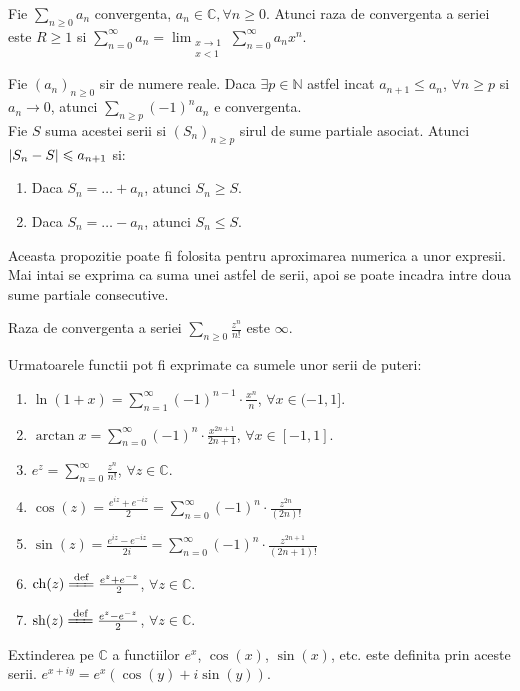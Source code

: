 \documentclass{article}
\begin{document}
\begin{enumerate}
  \propozitie Fie $\sum_{n \geq 0} a_n$ convergenta, $a_n \in \mathbb{C}, \forall n \geq 0$. Atunci raza de convergenta a seriei este $R \geq 1$ si $\sum_{n = 0}^{\infty} a_n = \lim_{\substack{ x \to 1 \\ x < 1}} \sum_{n = 0}^{\infty} a_n x^n$.

\begin{tcolorbox}
  \propozitie Fie $(a_n)_{n \geq 0}$ sir de numere reale. Daca $\exists p \in \mathbb{N}$ astfel incat $a_{n+1} \leq a_n$, $\forall n \geq p$ si $a_n \to 0$, atunci $\sum_{n \geq p} (-1)^n a_n$ e convergenta. \\ Fie $S$ suma acestei serii si $(S_n)_{n \geq p}$ sirul de sume partiale asociat. Atunci $\left\lvert S_n - S \right\rvert \leqslant a_{n+1}$ si:
  \begin{enumerate}
  \item Daca $S_n = \dots + a_n$, atunci $S_n \geq S$.
  \item Daca $S_n = \dots - a_n$, atunci $S_n \leq S$.
  \end{enumerate}

  \observatie Aceasta propozitie poate fi folosita pentru aproximarea numerica a unor expresii. Mai intai se exprima ca suma unei astfel de serii, apoi se poate incadra intre doua sume partiale consecutive.

\end{tcolorbox}

\propozitie Raza de convergenta a seriei $\sum_{n \geq 0} \frac{z^n}{n!}$ este $\infty$.

\begin{tcolorbox}
\propozitie Urmatoarele functii pot fi exprimate ca sumele unor serii de puteri:
  \begin{enumerate}[nosep]
    \item $\ln(1+x) = \sum_{n=1}^{\infty} (-1)^{n-1} \cdot \frac{x^n}{n}$, $\forall x \in (-1, 1]$.
    \item $\arctan x = \sum_{n = 0}^{\infty} (-1)^n \cdot \frac{x^{2n + 1}}{2n + 1}$, $\forall x \in [-1, 1]$.
    \item $e^z = \sum_{n = 0}^{\infty} \frac{z^n}{n!}$, $\forall z \in \mathbb{C}$.
    \item $\cos(z) = \frac{e^{iz} + e^{-iz}}{2} = \sum_{n=0}^{\infty} (-1)^n \cdot \frac{z^{2n}}{(2n)!}$
    \item $\sin(z) = \frac{e^{iz} - e^{-iz}}{2i} = \sum_{n=0}^{\infty} (-1)^n \cdot \frac{z^{2n+1}}{(2n+1)!}$
    \item $\cosh(z) \xlongequal{\text{def}} \frac{e^z + e^{-z}}{2}$, $\forall z \in \mathbb{C}$.
    \item $\sinh(z) \xlongequal{\text{def}} \frac{e^z - e^{-z}}{2}$, $\forall z \in \mathbb{C}$.

  \end{enumerate}
  \observatie Extinderea pe $\mathbb{C}$ a functiilor $e^x$, $\cos(x)$, $\sin(x)$, etc. este definita prin aceste serii.
  \observatie $e^{x + iy} = e^x(\cos(y) + i\sin(y))$.
\end{tcolorbox}


\end{enumerate}
\end{document}
